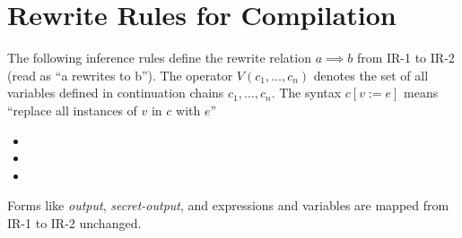 \documentclass{article}
\begin{document}
\section{Rewrite Rules for Compilation}
The following inference rules define the rewrite relation $a \implies b$ from IR-1 to IR-2 (read as ``a rewrites to b'').
The operator $V(c_1,\dots,c_n)$ denotes the set of all variables defined in continuation chains $c_1,\dots,c_n$.
The syntax $c[v:=e]$ means ``replace all instances of $v$ in $c$ with $e$''
\begin{itemize}
    \item[] 
    \item[] 
    \item[] 
\end{itemize}
Forms like {\em output}, {\em secret-output}, and expressions and variables are mapped from IR-1 to IR-2 unchanged.
\end{document}
